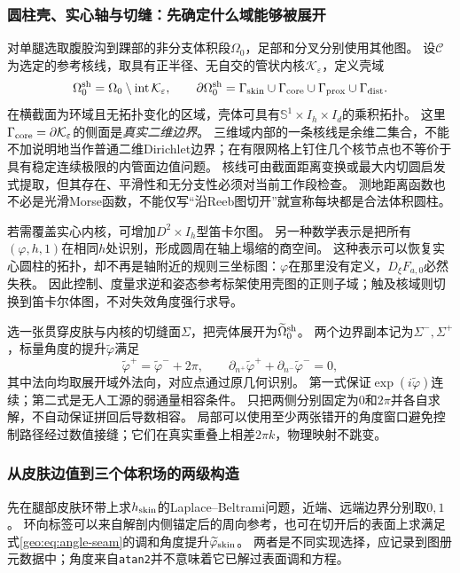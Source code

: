 \documentclass[11pt,a4paper]{article}
\numberwithin{equation}{section}
\theoremstyle{definition}
\begin{document}
\subsubsection{圆柱壳、实心轴与切缝：先确定什么域能够被展开}
对单腿选取腹股沟到踝部的非分支体积段$\Omega_0$，足部和分叉分别使用其他图。
设$\mathcal C$为选定的参考核线，取具有正半径、无自交的管状内核$\mathcal K_\varepsilon$，定义壳域
\begin{equation}
 \Omega_0^{\rm sh}=\Omega_0\setminus\operatorname{int}\mathcal K_\varepsilon,
 \qquad
 \partial\Omega_0^{\rm sh}=\Gamma_{\rm skin}\cup\Gamma_{\rm core}
                         \cup\Gamma_{\rm prox}\cup\Gamma_{\rm dist}.
 \label{geo:eq:shell-domain}
\end{equation}
在横截面为环域且无拓扑变化的区域，壳体可具有$\mathbb S^1\times I_h\times I_d$的乘积拓扑。
这里$\Gamma_{\rm core}=\partial\mathcal K_\varepsilon$的侧面是\emph{真实二维边界}。
三维域内部的一条核线是余维二集合，不能不加说明地当作普通二维Dirichlet边界；在有限网格上钉住几个核节点也不等价于具有稳定连续极限的内管面边值问题。
核线可由截面距离变换或最大内切圆启发式提取，但其存在、平滑性和无分支性必须对当前工作段检查。
测地距离函数也不必是光滑Morse函数，不能仅写“沿Reeb图切开”就宣称每块都是合法体积圆柱。

若需覆盖实心内核，可增加$D^2\times I_h$型笛卡尔图。
另一种数学表示是把所有$(\varphi,h,1)$在相同$h$处识别，形成圆周在轴上塌缩的商空间。
这种表示可以恢复实心圆柱的拓扑，却不再是轴附近的规则三坐标图：$\varphi$在那里没有定义，$D_\xi F_{a,0}$必然失秩。
因此控制、度量求逆和姿态参考标架使用壳图的正则子域；触及核域则切换到笛卡尔体图，不对失效角度强行求导。

选一张贯穿皮肤与内核的切缝面$\Sigma$，把壳体展开为$\widetilde\Omega_0^{\rm sh}$。
两个边界副本记为$\Sigma^-,\Sigma^+$，标量角度的提升$\widetilde\varphi$满足
\begin{equation}
 \widetilde\varphi^+=\widetilde\varphi^-+2\pi,
 \qquad
 \partial_{n^+}\widetilde\varphi^+
      +\partial_{n^-}\widetilde\varphi^-=0,
 \label{geo:eq:angle-seam}
\end{equation}
其中法向均取展开域外法向，对应点通过原几何识别。
第一式保证$\exp(i\widetilde\varphi)$连续；第二式是无人工源的弱通量相容条件。
只把两侧分别固定为$0$和$2\pi$并各自求解，不自动保证拼回后导数相容。
局部可以使用至少两张错开的角度窗口避免控制路径经过数值接缝；它们在真实重叠上相差$2\pi k$，物理映射不跳变。

\subsubsection{从皮肤边值到三个体积场的两级构造}
先在腿部皮肤环带上求$h_{\rm skin}$的Laplace--Beltrami问题，近端、远端边界分别取$0,1$。
环向标签可以来自解剖内侧锚定后的周向参考，也可在切开后的表面上求满足式\eqref{geo:eq:angle-seam}的调和角度提升$\widetilde\varphi_{\rm skin}$。
两者是不同实现选择，应记录到图册元数据中；角度来自\texttt{atan2}并不意味着它已解过表面调和方程。
\end{document}
